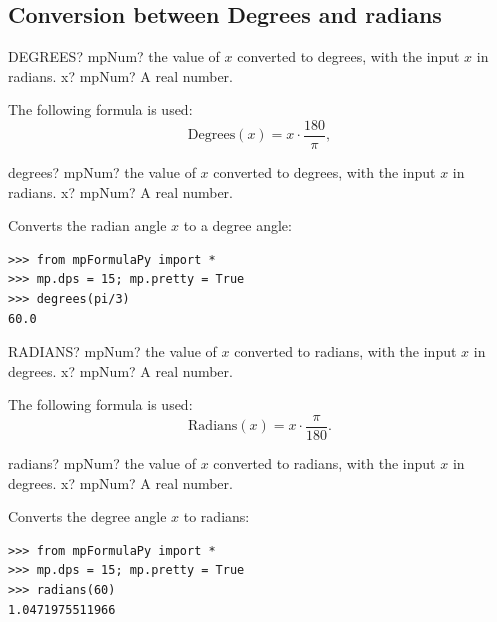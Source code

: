 \subsection{Conversion between Degrees and radians}

\begin{mpFunctionsExtract}
	\mpWorksheetFunctionOneNotImplemented
	{DEGREES? mpNum? the value of $x$ converted to degrees, with the input $x$ in radians.}
	{x? mpNum? A real number.}
\end{mpFunctionsExtract}
The following formula is used:
\begin{equation}
	\text{Degrees}(x) = x \cdot \frac{180}{\pi},
\end{equation}


\begin{mpFunctionsExtract}
	\mpFunctionOne
	{degrees? mpNum? the value of $x$ converted to degrees, with the input $x$ in radians.}
	{x? mpNum? A real number.}
\end{mpFunctionsExtract}

Converts the radian angle $x$ to a degree angle:
\begin{lstlisting}
>>> from mpFormulaPy import *
>>> mp.dps = 15; mp.pretty = True
>>> degrees(pi/3)
60.0
\end{lstlisting}



\begin{mpFunctionsExtract}
	\mpWorksheetFunctionOneNotImplemented
	{RADIANS? mpNum? the value of $x$ converted to radians, with the input $x$ in degrees.}
	{x? mpNum? A real number.}
\end{mpFunctionsExtract}

The following formula is used:
\begin{equation}
	\text{Radians}(x) = x \cdot \frac{\pi}{180}.
\end{equation}



\begin{mpFunctionsExtract}
	\mpFunctionOne
	{radians? mpNum? the value of $x$ converted to radians, with the input $x$ in degrees.}
	{x? mpNum? A real number.}
\end{mpFunctionsExtract}

Converts the degree angle $x$ to radians:
\begin{lstlisting}
>>> from mpFormulaPy import *
>>> mp.dps = 15; mp.pretty = True
>>> radians(60)
1.0471975511966
\end{lstlisting}




